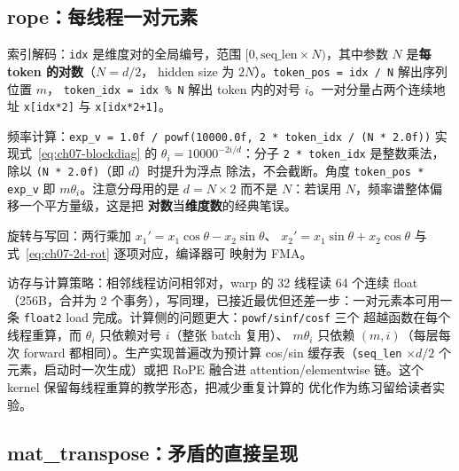 \subsection{rope：每线程一对元素}



索引解码：\texttt{idx} 是维度对的全局编号，范围
$[0, \text{seq\_len} \times N)$，其中参数 $N$ 是\textbf{每 token 的对数}（$N = d/2$，
hidden size 为 $2N$）。\texttt{token\_pos = idx / N} 解出序列位置 $m$，
\texttt{token\_idx = idx \% N} 解出 token 内的对号 $i$。一对分量占两个连续地址
\texttt{x[idx*2]} 与 \texttt{x[idx*2+1]}。

频率计算：\texttt{exp\_\allowbreak{}v =\allowbreak{} 1.0f /\allowbreak{} powf\allowbreak{}(10000.0f,\allowbreak{} 2 * token\_\allowbreak{}idx /\allowbreak{} (N * 2.0f))}
实现式~\eqref{eq:ch07-blockdiag} 的 $\theta_i = 10000^{-2i/d}$：分子
\texttt{2 * token\_idx} 是整数乘法，除以 \texttt{(N * 2.0f)}（即 $d$）时提升为浮点
除法，不会截断。角度 \texttt{token\_pos * exp\_v} 即 $m\theta_i$。注意分母用的是
$d = N \times 2$ 而不是 $N$：若误用 $N$，频率谱整体偏移一个平方量级，这是把
\textbf{对数}当\textbf{维度数}的经典笔误。

旋转与写回：两行乘加 $x_1' = x_1\cos\theta - x_2\sin\theta$、
$x_2' = x_1\sin\theta + x_2\cos\theta$ 与式~\eqref{eq:ch07-2d-rot} 逐项对应，编译器可
映射为 FMA。

访存与计算策略：相邻线程访问相邻对，warp 的 32 线程读 64 个连续 float
（256B，合并为 2 个事务），写同理，已接近最优但还差一步：一对元素本可用一条
\texttt{float2} load 完成。计算侧的问题更大：\texttt{powf/\allowbreak{}sinf/\allowbreak{}cosf} 三个
超越函数在每个线程重算，而 $\theta_i$ 只依赖对号 $i$（整张 batch 复用）、
$m\theta_i$ 只依赖 $(m, i)$（每层每次 forward 都相同）。生产实现普遍改为预计算
cos/sin 缓存表（\texttt{seq\_len} $\times d/2$ 个元素，启动时一次生成）或把 RoPE 融合进
attention/elementwise 链。这个 kernel 保留每线程重算的教学形态，把减少重复计算的
优化作为练习留给读者实验。

\subsection{mat\_transpose：矛盾的直接呈现}



